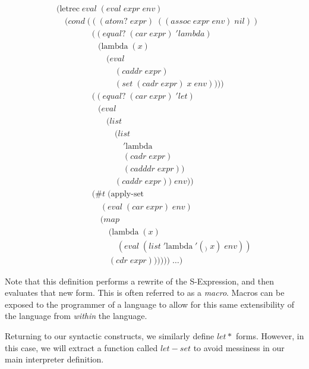 \begin{figure}[ht]
\caption{}\label{scheme}
\begin{align*}
& (\text{letrec} \; eval \; (eval \; expr \; env)
\\& \quad (cond \; (((atom? \; expr) \; ((assoc \; expr \; env) \; nil))
\\& \qquad \qquad \; ((equal? \; (car \; expr) \; 'lambda) \; 
\\& \qquad \qquad \quad (\text{lambda} \; (x) \; 
\\& \qquad \qquad \qquad (eval \; 
\\& \qquad \qquad \qquad \quad (caddr \; expr) \; 
\\& \qquad \qquad \qquad \quad (set \; (cadr \; expr) \; x \; env))))
\\& \qquad \qquad \; ((equal? \; (car \; expr) \; 'let)
\\& \qquad \qquad \quad (eval \; 
\\& \qquad \qquad \qquad (list \; 
\\& \qquad \qquad \qquad \quad (list \; 
\\& \qquad \qquad \qquad \qquad '\text{lambda} \; 
\\& \qquad \qquad \qquad \qquad (cadr \; expr) \; 
\\& \qquad \qquad \qquad \qquad (cadddr \; expr)) \; 
\\& \qquad \qquad \qquad \quad (caddr \; expr)) \; env))
\\& \qquad \qquad \; (\#t \; (\text{apply-set} \; 
\\& \qquad \qquad \quad \; (eval \; (car \; expr) \; env) \; 
\\& \qquad \qquad \quad \; (map \; 
\\& \qquad \qquad \qquad \; (\text{lambda} \; (x) \; 
\\& \qquad \qquad \qquad \quad \; (eval \; (list \; '\text{lambda} \; '(_) \; x) \; env)) \; 
\\& \qquad \qquad \qquad \; (cdr \; expr)))))) \; \dots)
\end{align*}
\end{figure}

Note that this definition performs a rewrite of the S-Expression, and then
evaluates that new form. This is often referred to as a \emph{macro}. Macros can
be exposed to the programmer of a language to allow for this same 
extensibility of the language from \emph{within} the language.

Returning to our syntactic constructs, we similarly define $let*$ forms. 
However, in this case, we will extract a function called $let-set$ to avoid 
messiness in our main interpreter definition.

